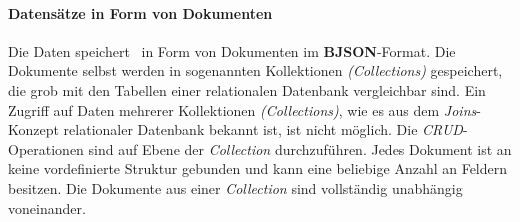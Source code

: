 \paragraph{Datensätze in Form von Dokumenten}

Die Daten speichert \mongo\ in Form von Dokumenten im \textbf{BJSON}-Format. Die Dokumente selbst werden in sogenannten Kollektionen \textit{(Collections)} gespeichert, die grob mit den Tabellen einer relationalen Datenbank vergleichbar sind. Ein Zugriff auf Daten mehrerer Kollektionen \textit{(Collections)}, wie es aus dem \textit{Joins}-Konzept relationaler Datenbank bekannt ist, ist nicht möglich. Die \textit{CRUD}-Operationen sind auf Ebene der \textit{Collection} durchzuführen. Jedes Dokument ist an keine vordefinierte Struktur gebunden und kann eine beliebige Anzahl an Feldern besitzen. Die Dokumente aus einer \textit{Collection} sind vollständig unabhängig voneinander. 

